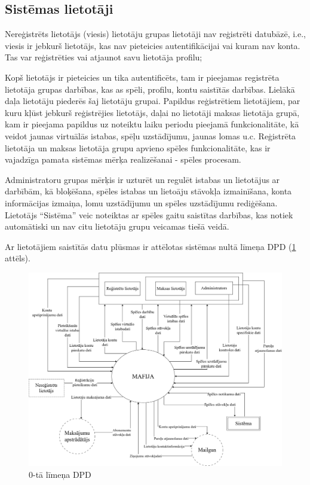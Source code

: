 \subsection{Sistēmas lietotāji}


Nereģistrēts lietotājs (viesis) lietotāju grupas lietotāji nav reģistrēti datubāzē, i.e., viesis ir jebkurš lietotājs, kas nav pieteicies autentifikācijai vai kuram nav konta.
Tas var reģistrēties vai atjaunot savu lietotāja profilu;

Kopš lietotājs ir pieteicies un tika autentificēts, tam ir pieejamas registrēta lietotāja grupas darbības, kas as spēli, profilu, kontu saistītās darbības.
Lielākā daļa lietotāju piederēs šaj lietotāju grupai.
Papildus reģistrētiem lietotājiem, par kuru kļūst jebkurš reģistrējies lietotājs, daļai no lietotāji maksas lietotāja grupā, kam ir pieejama papildus uz noteiktu laiku periodu pieejamā funkcionalitāte, kā veidot jaunas virtuālās istabas, spēļu uzstādījumu, jaunas lomas u.c.
Reģistrēta lietotāja un maksas lietotāja grupu apvieno spēles funkcionalitāte, kas ir vajadzīga pamata sistēmas mērķa realizēšanai - spēles procesam.

Administratoru grupas mērķis ir uzturēt un regulēt istabas un lietotājus ar darbībām, kā bloķēšana, spēles istabas un lietoāju stāvokļa izmainīšana, konta informācijas izmaiņa, lomu uzstādījumu un spēles uzstādījumu rediģēšana.
Lietotājs ``Sistēma'' veic noteiktas ar spēles gaitu saistītas darbības, kas notiek automātiski un nav citu lietotāju grupu veicamas tiešā veidā.

Ar lietotājiem saistītās datu plūsmas ir attēlotas sistēmas nultā līmeņa DPD (\ref{fig:dpd-0} attēls).


\begin{figure}[htbp]
	\centering
	\includegraphics[width=\linewidth]{./src/img/0tāLīmeņaDPD.png}
	\caption{0-tā līmeņa DPD}
	\label{fig:dpd-0}
\end{figure}
